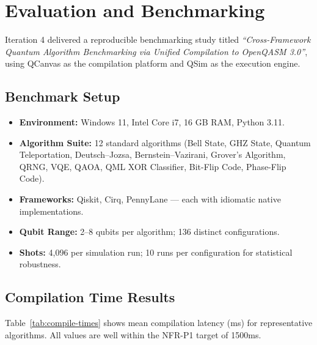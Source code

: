 \section{Evaluation and Benchmarking}

Iteration 4 delivered a reproducible benchmarking study titled \textit{``Cross-Framework Quantum Algorithm Benchmarking via Unified Compilation to OpenQASM 3.0''}, using QCanvas as the compilation platform and QSim as the execution engine.

\subsection{Benchmark Setup}
\begin{itemize}
    \item \textbf{Environment:} Windows 11, Intel Core i7, 16 GB RAM, Python 3.11.
    \item \textbf{Algorithm Suite:} 12 standard algorithms (Bell State, GHZ State, Quantum Teleportation, Deutsch--Jozsa, Bernstein--Vazirani, Grover's Algorithm, QRNG, VQE, QAOA, QML XOR Classifier, Bit-Flip Code, Phase-Flip Code).
    \item \textbf{Frameworks:} Qiskit, Cirq, PennyLane --- each with idiomatic native implementations.
    \item \textbf{Qubit Range:} 2--8 qubits per algorithm; 136 distinct configurations.
    \item \textbf{Shots:} 4,096 per simulation run; 10 runs per configuration for statistical robustness.
\end{itemize}

\subsection{Compilation Time Results}

Table~\ref{tab:compile-times} shows mean compilation latency (ms) for representative algorithms. All values are well within the NFR-P1 target of 1500ms.

